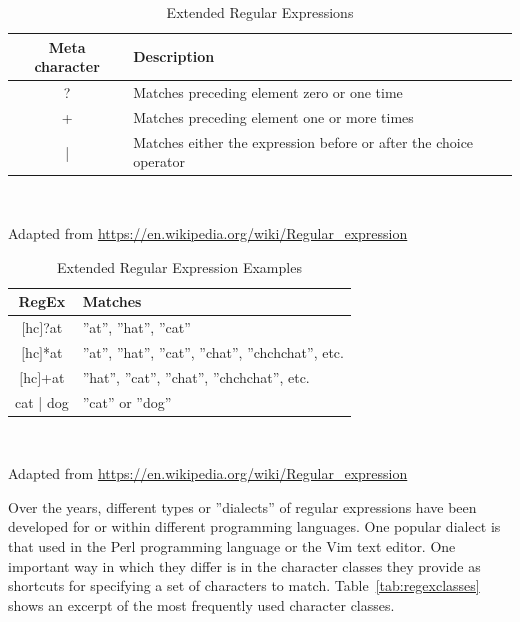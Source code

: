 \begin{table}
\small
\centering

\renewcommand{\arraystretch}{1.25}
\begin{tabularx}{\textwidth}{c|X} \hline
{\bf Meta character} & {\bf Description} \\ \hline \hline
? & Matches preceding element zero or one time \\ \hline
+ & Matches preceding element one or more times \\ \hline
| & Matches either the expression before or after the choice operator \\ \hline
\end{tabularx} \\
\vspace{.5\baselineskip}

{\footnotesize Adapted from \url{https://en.wikipedia.org/wiki/Regular_expression}}

\caption{Extended Regular Expressions}
\label{tab:regexex}
\end{table}

\begin{table}
\small
\centering
\renewcommand{\arraystretch}{1.25}

\begin{tabularx}{\textwidth}{c|X} \hline
{\bf RegEx} & {\bf Matches} \\ \hline \hline
$[$hc$]$?at & ''at'', ''hat'', ''cat'' \\ \hline
$[$hc$]$*at & ''at'', ''hat'', ''cat'', ''chat'', ''chchchat'', etc. \\ \hline
$[$hc$]$+at & ''hat'', ''cat'', ''chat'', ''chchchat'', etc. \\ \hline
cat | dog & ''cat'' or ''dog'' \\ \hline
\end{tabularx}  \\
\vspace{.5\baselineskip}

{\footnotesize Adapted from \url{https://en.wikipedia.org/wiki/Regular_expression}} 

\caption{Extended Regular Expression Examples}
\label{tab:regexexexamples}
\end{table}

Over the years, different types or ''dialects'' of regular expressions have been developed for or within different programming languages. One popular dialect is that used in the Perl programming language or the Vim text editor. One important way in which they differ is in the character classes they provide as shortcuts for specifying a set of characters to match. Table~\ref{tab:regexclasses} shows an excerpt of the most frequently used character classes. 


